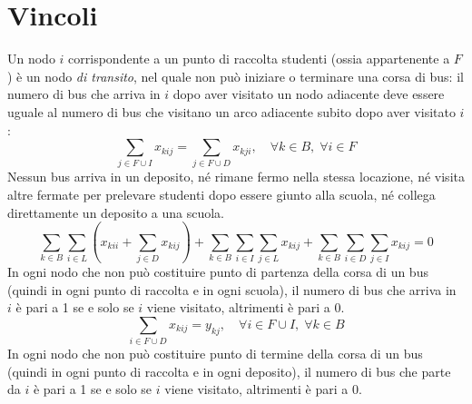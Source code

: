 \section{Vincoli}
\label{sec:constraints}
Un nodo $i$ corrispondente a un punto di raccolta studenti (ossia appartenente a $F$) è un nodo \textit{di transito}, nel quale non può iniziare o terminare una corsa di bus: il numero di bus che arriva in $i$ dopo aver visitato un nodo adiacente deve essere uguale al numero di bus che visitano un arco adiacente subito dopo aver visitato $i$:
\begin{equation}
    \sum_{j \in F \cup I} x_{kij} = \sum_{j \in F \cup D} x_{kji},\quad \forall k \in B,\;\forall i \in F
\end{equation}
Nessun bus arriva in un deposito, né rimane fermo nella stessa locazione, né visita altre fermate per prelevare studenti dopo essere giunto alla scuola, né collega direttamente un deposito a una scuola.
\begin{equation}
  \label{eq:forbiddenMovements}
    \sum_{k \in B}\sum_{i \in L}(x_{kii} + \sum_{j \in D}x_{kij}) + \sum_{k \in B}\sum_{i \in I}\sum_{j \in L}x_{kij} + \sum_{k \in B}\sum_{i \in D}\sum_{j \in I}x_{kij} = 0
\end{equation}
In ogni nodo che non può costituire punto di partenza della corsa di un bus (quindi in ogni punto di raccolta e in ogni scuola), il numero di bus che arriva in $i$ è pari a 1 se e solo se $i$ viene visitato, altrimenti è pari a 0.
\begin{equation}
  \sum_{i \in F \cup D} x_{kij} = y_{kj},\quad \forall i \in F \cup I,\; \forall k \in B
\end{equation}
In ogni nodo che non può costituire punto di termine della corsa di un bus (quindi in ogni punto di raccolta e in ogni deposito), il numero di bus che parte da $i$ è pari a 1 se e solo se $i$ viene visitato, altrimenti è pari a 0.

